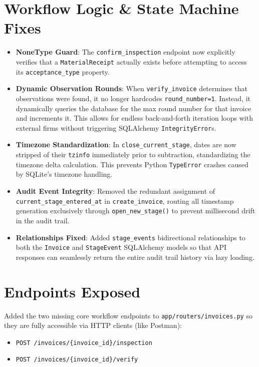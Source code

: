 \documentclass[11pt,a4paper]{article}
\newcommand{\code}[1]{\colorbox{codebg}{\texttt{#1}}}
\begin{document}
\section{Workflow Logic \& State Machine Fixes}
\begin{itemize}[leftmargin=*, itemsep=0.8em]
    \item \textbf{NoneType Guard}: The \code{confirm\_inspection} endpoint now explicitly verifies that a \code{MaterialReceipt} actually exists before attempting to access its \code{acceptance\_type} property.
    \item \textbf{Dynamic Observation Rounds}: When \code{verify\_invoice} determines that observations were found, it no longer hardcodes \code{round\_number=1}. Instead, it dynamically queries the database for the max round number for that invoice and increments it. This allows for endless back-and-forth iteration loops with external firms without triggering SQLAlchemy \code{IntegrityError}s.
    \item \textbf{Timezone Standardization}: In \code{close\_current\_stage}, dates are now stripped of their \code{tzinfo} immediately prior to subtraction, standardizing the timezone delta calculation. This prevents Python \code{TypeError} crashes caused by SQLite's timezone handling.
    \item \textbf{Audit Event Integrity}: Removed the redundant assignment of \code{current\_stage\_entered\_at} in \code{create\_invoice}, routing all timestamp generation exclusively through \code{open\_new\_stage()} to prevent millisecond drift in the audit trail.
    \item \textbf{Relationships Fixed}: Added \code{stage\_events} bidirectional relationships to both the \code{Invoice} and \code{StageEvent} SQLAlchemy models so that API responses can seamlessly return the entire audit trail history via lazy loading.
\end{itemize}

\section{Endpoints Exposed}
Added the two missing core workflow endpoints to \code{app/routers/invoices.py} so they are fully accessible via HTTP clients (like Postman):
\begin{itemize}[leftmargin=*]
    \item \code{POST /invoices/\{invoice\_id\}/inspection}
    \item \code{POST /invoices/\{invoice\_id\}/verify}
\end{itemize}
\end{document}
